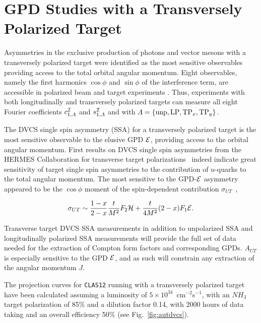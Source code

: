 \section{GPD Studies with a Transversely Polarized Target}

Asymmetries in the exclusive production of photons and vector mesons with a
transversely polarized target were identified as the most sensitive 
observables providing access to the total orbital angular momentum.  Eight 
observables, namely the first harmonics $\cos \phi$ and $\sin \phi$ of the 
interference term, are accessible in polarized beam and target experiments 
\cite{Belitsky:2001ns}.  Thus, experiments with both longitudinally and
transversely polarized targets can measure all eight Fourier coefficients
$c_{1,{\mit\Lambda}}^{\cal I}$ and $s_{1,{\mit\Lambda}}^{\cal I}$ and
with ${\mit\Lambda} = \{ {\rm unp}, {\rm LP}, {\rm TP}_x, {\rm TP}_y \}$. 

The DVCS single spin asymmetry (SSA) for a transversely polarized target is 
the most sensitive observable to the elusive GPD $\cal E$, providing access 
to the orbital angular momentum.  First results on DVCS single spin asymmetries 
from the HERMES Collaboration for transverse target polarizations~\cite{HERAUT} 
indeed indicate great sensitivity of target single spin asymmetries to the 
contribution of $u$-quarks to the total angular momentum.  The most 
sensitive to the GPD-$\cal{E}$ asymmetry appeared to be the $\cos \phi$ moment 
of the spin-dependent contribution $\sigma_{UT}$~\cite{Belitsky:2001ns},

\begin{equation}
\label{AUT}
\sigma_{UT} \sim \frac{1-x}{2-x}\frac{t}{M^2}F_2{\cal H}
+ \frac{t}{4M^2}(2-x)F_1{\cal E}.
\end{equation}

Transverse target DVCS SSA measurements in addition to unpolarized SSA and 
longitudinally polarized SSA measurements will provide the full set of data 
needed for the extraction of Compton form factors and corresponding GPDs. 
$A_{UT}$ is especially sensitive to the GPD $\cal E$, and as such will
constrain any extraction of the angular momentum $J$.

The projection curves for {\tt CLAS12} running with a transversely polarized 
target have been calculated assuming a luminosity of 
$5 \times 10^{34}$~cm$^{-2}$s$^{-1}$, with an $NH_3$ target polarization of 
85\% and a dilution factor 0.14, with 2000 hours of data taking and an 
overall efficiency 50\% (see Fig.~\ref{fig:autdvcs}).

